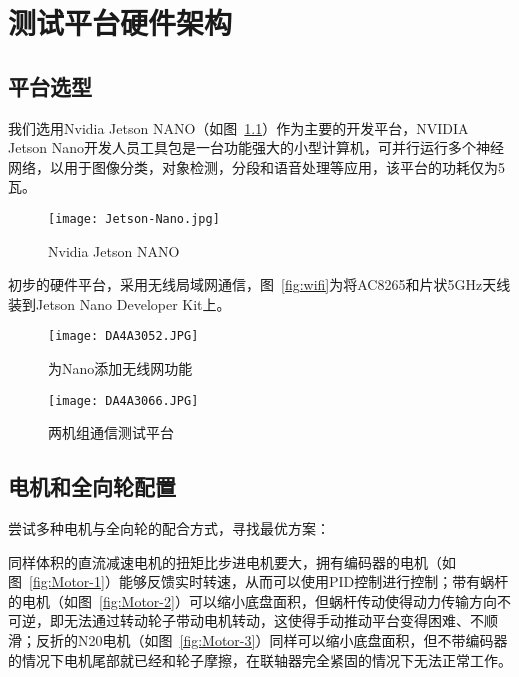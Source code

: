 \chapter{测试平台硬件架构}
\label{cha:Hardware}

\section{平台选型}

我们选用Nvidia Jetson NANO（如图~\ref{fig:Jetson-Nano}）作为主要的开发平台，NVIDIA Jetson Nano开发人员工具包是一台功能强大的小型计算机，可并行运行多个神经网络，以用于图像分类，对象检测，分段和语音处理等应用，该平台的功耗仅为5瓦。

\begin{figure}[htbp] %
    \centering
    \texttt{[image: Jetson-Nano.jpg]}
    \caption{Nvidia Jetson NANO}
    \label{fig:Jetson-Nano}
\end{figure}

初步的硬件平台，采用无线局域网通信，图~\ref{fig:wifi}为将AC8265和片状5GHz天线装到Jetson Nano Developer Kit上。

\begin{figure}[htbp]
    \begin{minipage}{0.48\textwidth}
      \centering
      \texttt{[image: DA4A3052.JPG]}
      \caption{为Nano添加无线网功能}
      \label{fig:wifi}
    \end{minipage}\hfill
    \begin{minipage}{0.48\textwidth}
      \centering
      \texttt{[image: DA4A3066.JPG]}
      \caption{两机组通信测试平台}
      \label{fig:two-setup}
    \end{minipage}
\end{figure}


\section{电机和全向轮配置}

尝试多种电机与全向轮的配合方式，寻找最优方案：

同样体积的直流减速电机的扭矩比步进电机要大，拥有编码器的电机（如图~\ref{fig:Motor-1}）能够反馈实时转速，从而可以使用PID控制进行控制；带有蜗杆的电机（如图~\ref{fig:Motor-2}）可以缩小底盘面积，但蜗杆传动使得动力传输方向不可逆，即无法通过转动轮子带动电机转动，这使得手动推动平台变得困难、不顺滑；反折的N20电机（如图~\ref{fig:Motor-3}）同样可以缩小底盘面积，但不带编码器的情况下电机尾部就已经和轮子摩擦，在联轴器完全紧固的情况下无法正常工作。

